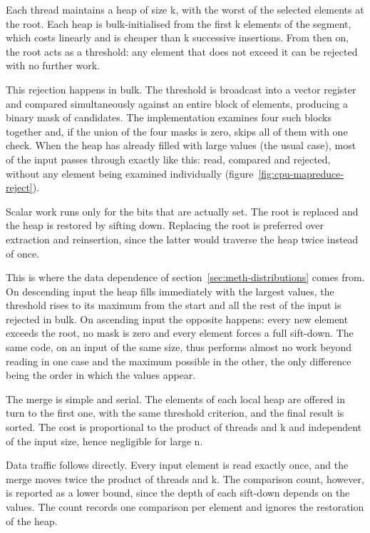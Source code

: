 Each thread maintains a heap of size k, with the worst of the selected elements
at the root. Each heap is bulk-initialised from the first k elements of the
segment, which costs linearly and is cheaper than k successive insertions. From
then on, the root acts as a threshold: any element that does not exceed it can
be rejected with no further work.

This rejection happens in bulk. The threshold is broadcast into a vector
register and compared simultaneously against an entire block of elements,
producing a binary mask of candidates. The implementation examines four such
blocks together and, if the union of the four masks is zero, skips all of them
with one check. When the heap has already filled with large values (the usual
case), most of the input passes through exactly like this: read, compared and
rejected, without any element being examined individually
(figure~\ref{fig:cpu-mapreduce-reject}).



Scalar work runs only for the bits that are actually set. The root is replaced
and the heap is restored by sifting down. Replacing the root is preferred over
extraction and reinsertion, since the latter would traverse the heap twice
instead of once.

This is where the data dependence of section~\ref{sec:meth-distributions} comes
from. On descending input the heap fills immediately with the largest values,
the threshold rises to its maximum from the start and all the rest of the input
is rejected in bulk. On ascending input the opposite happens: every new element
exceeds the root, no mask is zero and every element forces a full sift-down.
The same code, on an input of the same size, thus performs almost no work
beyond reading in one case and the maximum possible in the other, the only
difference being the order in which the values appear.

The merge is simple and serial. The elements of each local heap are offered in
turn to the first one, with the same threshold criterion, and the final result
is sorted. The cost is proportional to the product of threads and k and
independent of the input size, hence negligible for large n.

Data traffic follows directly. Every input element is read exactly once, and
the merge moves twice the product of threads and k. The comparison count,
however, is reported as a lower bound, since the depth of each sift-down
depends on the values. The count records one comparison per element and ignores
the restoration of the heap.

